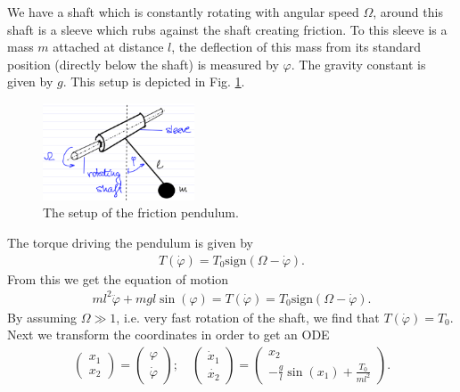  \begin{ex}
	 We have a shaft which is constantly rotating with angular speed $\Omega $, around this shaft is a sleeve which rubs against the shaft creating friction. To this sleeve is a mass $m$ attached at distance $l$, the deflection of this mass from its standard position (directly below the shaft) is measured by $\varphi$. The gravity constant is given by $g$. This setup is depicted in Fig. \ref{fig:friction_pend}.
\begin{figure}[h!]
	\centering
	\includegraphics[width=0.4\textwidth]{figures/ch2/27friction_pend.png}
	\caption{The setup of the friction pendulum.}
	\label{fig:friction_pend}
\end{figure}
The torque driving the pendulum is given by 
\begin{align}
	T(\dot{\varphi}) = T_0  \textrm{sign}(\Omega - \dot{\varphi}).
\end{align}
From this we get the equation of motion
\begin{align}
	ml^2 \ddot{\varphi} + mgl \sin(\varphi) = T(\dot{\varphi}) = T_0  \textrm{sign} (\Omega - \dot{\varphi}).
\end{align}
By assuming $\Omega \gg 1$, i.e. very fast rotation of the shaft, we find that $T(\dot{\varphi}) = T_0$. Next we transform the coordinates in order to get an ODE
\begin{align}
	\begin{pmatrix}
		x_1 \\ x_2
	\end{pmatrix}
	=
	\begin{pmatrix}
		\varphi \\ \dot{\varphi}
	\end{pmatrix}
	;\quad
	\begin{pmatrix}
		\dot{x}_1 \\ \dot{x_2}
	\end{pmatrix}
=
\begin{pmatrix}
	x_2 \\ - \frac{g}{l} \sin(x_1) + \frac{T_0}{ml^2}
\end{pmatrix}
.
\end{align}

\end{ex}
